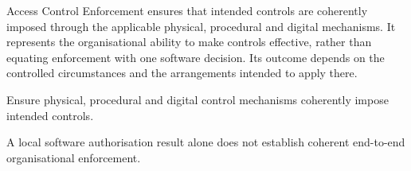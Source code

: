 Access Control Enforcement ensures that intended controls are coherently imposed through the applicable physical, procedural and digital mechanisms. It represents the organisational ability to make controls effective, rather than equating enforcement with one software decision. Its outcome depends on the controlled circumstances and the arrangements intended to apply there.



Ensure physical, procedural and digital control mechanisms coherently impose intended controls.



A local software authorisation result alone does not establish coherent end-to-end organisational enforcement.


